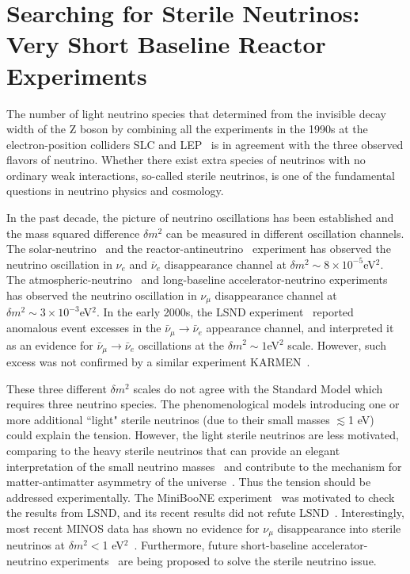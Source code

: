 \section{Searching for Sterile Neutrinos: Very Short Baseline Reactor Experiments}

The number of light neutrino species that determined from the invisible decay width of the Z boson by combining all the experiments in the 1990s at the electron-position colliders SLC and LEP~\cite{EW-2005} is in agreement with the three observed flavors of neutrino. Whether there exist extra species of neutrinos with no ordinary weak interactions, so-called sterile neutrinos, is one of the fundamental questions in neutrino physics and cosmology.

In the past decade, the picture of neutrino oscillations has been established and the mass squared difference $\delta m^2$ can be measured in different oscillation channels. The solar-neutrino~\cite{SNO} and the reactor-antineutrino~\cite{Kamland03} experiment has observed the neutrino oscillation in $\nu_e$ and $\bar\nu_e$ disappearance channel at $\delta m^2\sim8\times10^{-5}$eV$^2$. The atmospheric-neutrino~\cite{SuperK98} and long-baseline accelerator-neutrino experiments~\cite{K2K-2003,MINOS06} has observed the neutrino oscillation in $\nu_\mu$ disappearance channel at $\delta m^2\sim3\times10^{-3}$eV$^2$. In the early 2000s, the LSND experiment~\cite{LSND2001} reported anomalous event excesses in the $\bar\nu_\mu\rightarrow\bar\nu_e$ appearance channel, and interpreted it as an evidence for $\bar\nu_\mu\rightarrow\bar\nu_e$ oscillations at the $\delta m^2\sim1$eV$^2$ scale. However, such excess was not confirmed by a similar experiment KARMEN~\cite{KARMEN2002}.

These three different $\delta m^2$ scales do not agree with the Standard Model which requires three neutrino species. The phenomenological models introducing one or more additional ``light" sterile neutrinos (due to their small masses $\lesssim$1 eV)~\cite{Serel04} could explain the tension. However, the light sterile neutrinos are less motivated, comparing to the heavy sterile neutrinos that can provide an elegant interpretation of the small neutrino masses~\cite{SeeSaw} and contribute to the mechanism for matter-antimatter asymmetry of the universe~\cite{leptogenesis}. Thus the tension should be addressed experimentally. The MiniBooNE experiment~\cite{MiniBooNE2007} was motivated to check the results from LSND, and its recent results did not refute LSND~\cite{MiniBooNE2013}. Interestingly, most recent MINOS data has shown no evidence for $\nu_\mu$ disappearance into sterile neutrinos at $\delta m^2<$1 eV$^2$~\cite{Sousa-Neutrino14}. Furthermore, future short-baseline accelerator-neutrino experiments~\cite{nuSTORM,IsoDAR} are being proposed to solve the sterile neutrino issue.

